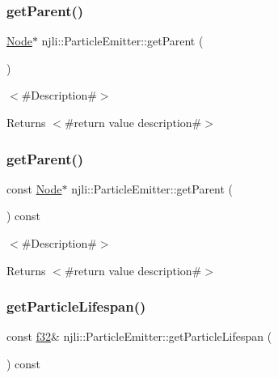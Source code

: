 \subsubsection{\texorpdfstring{get\+Parent()}{getParent()}\hspace{0.1cm}{\footnotesize\ttfamily [1/2]}}
{\footnotesize\ttfamily \mbox{\hyperlink{classnjli_1_1_node}{Node}}$\ast$ njli\+::\+Particle\+Emitter\+::get\+Parent (\begin{DoxyParamCaption}{ }\end{DoxyParamCaption})}

$<$\#\+Description\#$>$

\begin{DoxyReturn}{Returns}
$<$\#return value description\#$>$ 
\end{DoxyReturn}
\mbox{\label{classnjli_1_1_particle_emitter_a1bb095000e8c08a2e09598e50b85e0cc}} 
\subsubsection{\texorpdfstring{get\+Parent()}{getParent()}\hspace{0.1cm}{\footnotesize\ttfamily [2/2]}}
{\footnotesize\ttfamily const \mbox{\hyperlink{classnjli_1_1_node}{Node}}$\ast$ njli\+::\+Particle\+Emitter\+::get\+Parent (\begin{DoxyParamCaption}{ }\end{DoxyParamCaption}) const}

$<$\#\+Description\#$>$

\begin{DoxyReturn}{Returns}
$<$\#return value description\#$>$ 
\end{DoxyReturn}
\mbox{\label{classnjli_1_1_particle_emitter_a6218eed2c61aa532844d1dda807a8c21}} 
\subsubsection{\texorpdfstring{get\+Particle\+Lifespan()}{getParticleLifespan()}}
{\footnotesize\ttfamily const \mbox{\hyperlink{_util_8h_a5f6906312a689f27d70e9d086649d3fd}{f32}}\& njli\+::\+Particle\+Emitter\+::get\+Particle\+Lifespan (\begin{DoxyParamCaption}{ }\end{DoxyParamCaption}) const}

